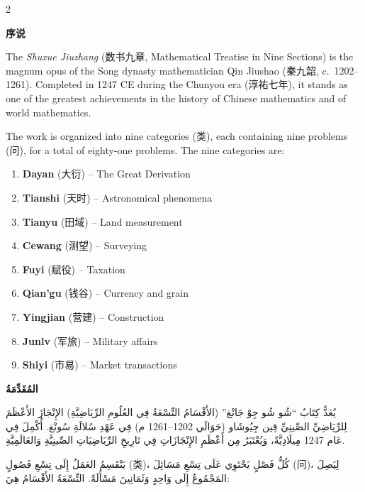 \documentclass[11pt,a4paper]{article}
\newcommand{\ar}[1]{\arabicfont\beginR #1\endR}
\newcommand{\zhtext}[1]{{\chinese #1}}
\newenvironment{bilingual}{%
  \begin{paracol}{2}
}{%
  \end{paracol}
}
\begin{document}
\begin{bilingual}

\begin{leftcolumn*}
\textbf{\zhtext{序说}}

The \textit{Shuxue Jiuzhang} (\zhtext{数书九章}, Mathematical Treatise in Nine Sections) is the magnum opus of the Song dynasty mathematician Qin Jiushao (\zhtext{秦九韶}, c.~1202--1261). Completed in 1247 CE during the Chunyou era (\zhtext{淳祐七年}), it stands as one of the greatest achievements in the history of Chinese mathematics and of world mathematics.

The work is organized into nine categories (\zhtext{类}), each containing nine problems (\zhtext{问}), for a total of eighty-one problems. The nine categories are:

\begin{enumerate}[label=\arabic*.]
  \item \textbf{Dayan} (\zhtext{大衍}) -- The Great Derivation
  \item \textbf{Tianshi} (\zhtext{天时}) -- Astronomical phenomena
  \item \textbf{Tianyu} (\zhtext{田域}) -- Land measurement
  \item \textbf{Cewang} (\zhtext{测望}) -- Surveying
  \item \textbf{Fuyi} (\zhtext{赋役}) -- Taxation
  \item \textbf{Qian'gu} (\zhtext{钱谷}) -- Currency and grain
  \item \textbf{Yingjian} (\zhtext{营建}) -- Construction
  \item \textbf{Junlv} (\zhtext{军旅}) -- Military affairs
  \item \textbf{Shiyi} (\zhtext{市易}) -- Market transactions
\end{enumerate}
\end{leftcolumn*}

\begin{rightcolumn*}
\ar{\textbf{المُقَدِّمَةُ}}

\ar{يُعَدُّ كِتَابُ \enquote{شُو شُو جِوْ جَانْغ} (الأَقْسَامُ التِّسْعَةُ فِي العُلُومِ الرِّيَاضِيَّةِ) الإِنْجَازَ الأَعْظَمَ لِلرِّيَاضِيِّ الصِّينِيِّ قِين جِيُوشَاو (حَوَالَي 1202--1261 م) فِي عَهْدِ سُلالَةِ سُونْغ. أُكْمِلَ فِي عَام 1247 مِيلَادِيَّةً، وَيُعْتَبَرُ مِن أَعْظَمِ الإِنْجَازَاتِ فِي تَارِيخِ الرِّيَاضِيَاتِ الصِّينِيَّةِ وَالعَالَمِيَّةِ.}

\ar{يَنْقَسِمُ العَمَلُ إِلَى تِسْعِ فَصُولٍ (类)، كُلُّ فَصْلٍ يَحْتَوِي عَلَى تِسْعِ مَسَائِلَ (问)، لِيَصِلَ المَجْمُوعُ إِلَى وَاحِدٍ وَثَمَانِينَ مَسْأَلَةً. التِّسْعَةُ الأَقْسَامُ هِيَ:}


\end{rightcolumn*}
\end{bilingual}
\end{document}
